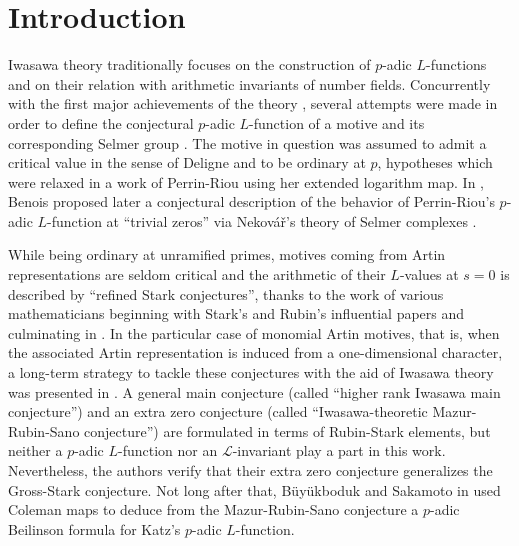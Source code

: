 \documentclass[12pt]{amsart}
\newcommand\cL{\mathcal{L}}
\newcommand\finir{{\color{red} A finir ! }}
\theoremstyle{defstyle}
\theoremstyle{thmstyle}
\begin{document}
\section{Introduction}
Iwasawa theory traditionally focuses on the construction of $p$-adic $L$-functions and on their relation with arithmetic invariants of number fields. Concurrently with the first major achievements of the theory \cite{mazurwiles,wiles1990iwasawa,rubin1991main}, several attempts were made in order to define the conjectural $p$-adic $L$-function of a motive \cite{coatesperrinriou,coatesmotivic,greenberg1994trivial} and its corresponding Selmer group \cite{greenberg1989iwasawa,greenberg153iwasawa}. The motive in question was assumed to admit a critical value in the sense of Deligne and to be ordinary at $p$, hypotheses which were relaxed in a work of Perrin-Riou \cite{perrin1995fonctions} using her extended logarithm map.  In \cite{benoiscrys}, Benois proposed later a conjectural description of the behavior of Perrin-Riou's $p$-adic $L$-function at ``trivial zeros'' via Nekov\'a\v{r}'s theory of Selmer complexes \cite{sel}. 



While being ordinary at unramified primes, motives coming from Artin representations are seldom critical and the arithmetic of their $L$-values at $s=0$ is described by ``refined Stark conjectures'', thanks to the work of various mathematicians beginning with Stark's and Rubin's influential papers \cite{stark2,stark4,rubinstark} and culminating in \cite{burnsLseries}. In the particular case of monomial Artin motives, that is, when the associated Artin representation is induced from a one-dimensional character, a long-term strategy to tackle these conjectures with the aid of Iwasawa theory was presented in \cite{BKSANT}. A general main conjecture (called ``higher rank Iwasawa main conjecture'') and an extra zero conjecture (called ``Iwasawa-theoretic Mazur-Rubin-Sano conjecture'') are formulated in terms of Rubin-Stark elements, but neither a $p$-adic $L$-function nor an $\cL$-invariant play a part in this work. Nevertheless, the authors verify that their extra zero conjecture generalizes the Gross-Stark conjecture. Not long after that, B{\"u}y{\"u}kboduk and Sakamoto in \cite{buyukboduksakamoto} used Coleman maps to deduce from the Mazur-Rubin-Sano conjecture a $p$-adic Beilinson formula for Katz's $p$-adic $L$-function.
\end{document}
